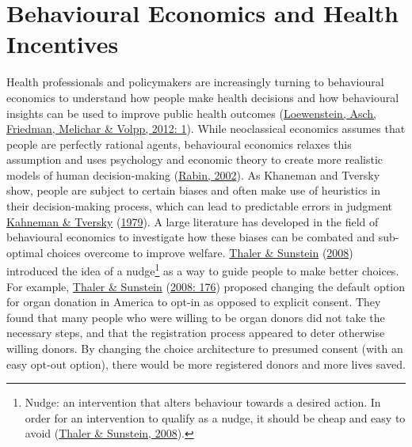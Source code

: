 \documentclass[11pt,preprint, authoryear]{elsarticle}
\numberwithin{equation}{section}
\numberwithin{figure}{section}
\numberwithin{table}{section}
\let\rmarkdownfootnote\footnote%
\def\footnote{\protect\rmarkdownfootnote}
\begin{document}
\hypertarget{behavioural-economics-and-health-incentives}{%
\section{\texorpdfstring{Behavioural Economics and Health Incentives
\label{lit}}{Behavioural Economics and Health Incentives }}\label{behavioural-economics-and-health-incentives}}

Health professionals and policymakers are increasingly turning to
behavioural economics to understand how people make health decisions and
how behavioural insights can be used to improve public health outcomes
(\protect\hyperlink{ref-health}{Loewenstein, Asch, Friedman, Melichar \&
Volpp, 2012: 1}). While neoclassical economics assumes that people are
perfectly rational agents, behavioural economics relaxes this assumption
and uses psychology and economic theory to create more realistic models
of human decision-making (\protect\hyperlink{ref-rabin}{Rabin, 2002}).
As Khaneman and Tversky show, people are subject to certain biases and
often make use of heuristics in their decision-making process, which can
lead to predictable errors in judgment
\protect\hyperlink{ref-prospect}{Kahneman \& Tversky}
(\protect\hyperlink{ref-prospect}{1979}). A large literature has
developed in the field of behavioural economics to investigate how these
biases can be combated and sub-optimal choices overcome to improve
welfare. \protect\hyperlink{ref-nudge}{Thaler \& Sunstein}
(\protect\hyperlink{ref-nudge}{2008}) introduced the idea of a
nudge\footnote{Nudge: an intervention that alters behaviour towards a
  desired action. In order for an intervention to qualify as a nudge, it
  should be cheap and easy to avoid
  (\protect\hyperlink{ref-nudge}{Thaler \& Sunstein, 2008}).} as a way
to guide people to make better choices. For example,
\protect\hyperlink{ref-nudge}{Thaler \& Sunstein}
(\protect\hyperlink{ref-nudge}{2008: 176}) proposed changing the default
option for organ donation in America to opt-in as opposed to explicit
consent. They found that many people who were willing to be organ donors
did not take the necessary steps, and that the registration process
appeared to deter otherwise willing donors. By changing the choice
architecture to presumed consent (with an easy opt-out option), there
would be more registered donors and more lives saved.
\end{document}

